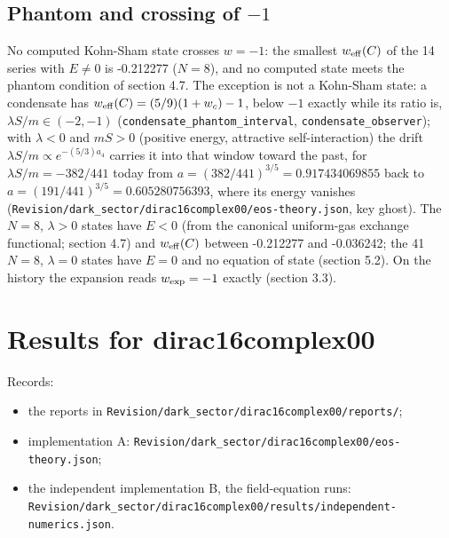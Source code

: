 \documentclass[11pt]{article}
\begin{document}
\subsection{Phantom and crossing of \texorpdfstring{$-1$}{-1}}

No computed Kohn-Sham state crosses $w = -1$: the smallest $w_{\rm eff}(C)$ of the 14 series with $E \neq 0$ is -0.212277 ($N = 8$), and no computed state meets the phantom condition of section 4.7. The exception is not a Kohn-Sham state: a condensate has $w_{\rm eff}(C) = (5/9)(1 + w_c) - 1$, below $-1$ exactly while its ratio is, $\lambda S/m \in (-2, -1)$ (\texttt{condensa\allowbreak{}te\_phant\allowbreak{}om\_inter\allowbreak{}val}, \texttt{condensa\allowbreak{}te\_obser\allowbreak{}ver}); with $\lambda < 0$ and $mS > 0$ (positive energy, attractive self-interaction) the drift $\lambda S/m \propto e^{-(5/3)a_4}$ carries it into that window toward the past, for $\lambda S/m = -382/441$ today from $a = (382/441)^{3/5} = 0.917434069855$ back to $a = (191/441)^{3/5} = 0.605280756393$, where its energy vanishes (\texttt{Revision\allowbreak{}/dark\_se\allowbreak{}ctor/dir\allowbreak{}ac16comp\allowbreak{}lex00/eo\allowbreak{}s-theory\allowbreak{}.json}, key ghost). The $N = 8$, $\lambda > 0$ states have $E < 0$ (from the canonical uniform-gas exchange functional; section 4.7) and $w_{\rm eff}(C)$ between -0.212277 and -0.036242; the 41 $N = 8$, $\lambda = 0$ states have $E = 0$ and no equation of state (section 5.2). On the history the expansion reads $w_{\rm exp} = -1$ exactly (section 3.3).

\section{Results for dirac16complex00}

Records:

\begin{itemize}
\item the reports in \texttt{Revision\allowbreak{}/dark\_se\allowbreak{}ctor/dir\allowbreak{}ac16comp\allowbreak{}lex00/re\allowbreak{}ports/};
\item implementation A: \texttt{Revision\allowbreak{}/dark\_se\allowbreak{}ctor/dir\allowbreak{}ac16comp\allowbreak{}lex00/eo\allowbreak{}s-theory\allowbreak{}.json};
\item the independent implementation B, the field-equation runs: \texttt{Revision\allowbreak{}/dark\_se\allowbreak{}ctor/dir\allowbreak{}ac16comp\allowbreak{}lex00/re\allowbreak{}sults/in\allowbreak{}dependen\allowbreak{}t-numeri\allowbreak{}cs.json}.
\end{itemize}
\end{document}
